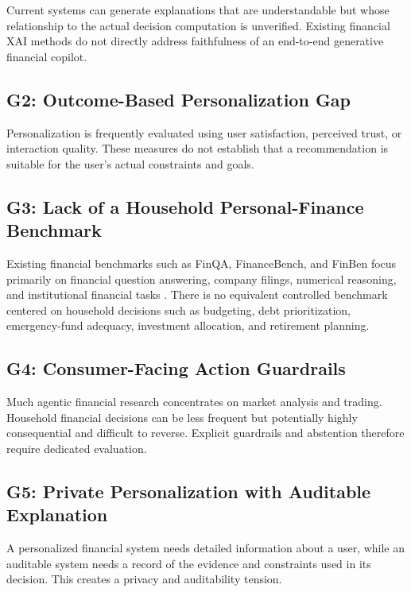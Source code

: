 \documentclass[12pt,a4paper]{article}
\begin{document}
Current systems can generate explanations that are understandable but whose relationship to the actual decision computation is unverified. Existing financial XAI methods do not directly address faithfulness of an end-to-end generative financial copilot.

\subsection{G2: Outcome-Based Personalization Gap}

Personalization is frequently evaluated using user satisfaction, perceived trust, or interaction quality. These measures do not establish that a recommendation is suitable for the user's actual constraints and goals.

\subsection{G3: Lack of a Household Personal-Finance Benchmark}

Existing financial benchmarks such as FinQA, FinanceBench, and FinBen focus primarily on financial question answering, company filings, numerical reasoning, and institutional financial tasks \cite{chen2021finqa,islam2023financebench,xie2024finben}. There is no equivalent controlled benchmark centered on household decisions such as budgeting, debt prioritization, emergency-fund adequacy, investment allocation, and retirement planning.

\subsection{G4: Consumer-Facing Action Guardrails}

Much agentic financial research concentrates on market analysis and trading. Household financial decisions can be less frequent but potentially highly consequential and difficult to reverse. Explicit guardrails and abstention therefore require dedicated evaluation.

\subsection{G5: Private Personalization with Auditable Explanation}

A personalized financial system needs detailed information about a user, while an auditable system needs a record of the evidence and constraints used in its decision. This creates a privacy and auditability tension.
\end{document}
